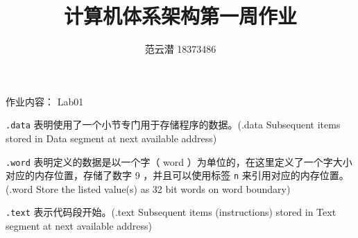 \documentclass[lang=cn,11pt,a4paper,cite=authoryear]{elegantpaper}
\title{计算机体系架构\quad 第一周作业}
\author{范云潜 18373486}
\institute{微电子学院 184111 班}
\date{\zhtoday}
\begin{document}
\maketitle

作业内容： Lab01

\tableofcontents






\lstinline{.data} 表明使用了一个小节专门用于存储程序的数据。(.data       Subsequent items stored in Data segment at next available address)

\lstinline{.word} 表明定义的数据是以一个字（ word ）为单位的，在这里定义了一个字大小对应的内存位置，存储了数字 9 ，并且可以使用标签 \lstinline{n} 来引用对应的内存位置。(.word       Store the listed value(s) as 32 bit words on word boundary)

\lstinline{.text} 表示代码段开始。(.text       Subsequent items (instructions) stored in Text segment at next available address)



\end{document}
